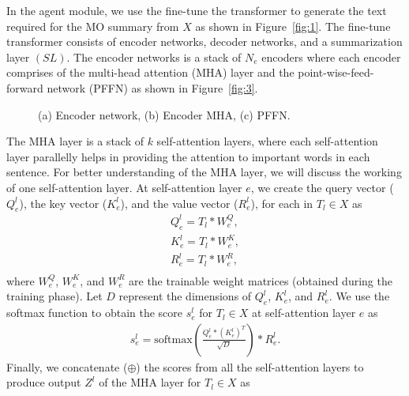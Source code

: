 \documentclass[preprint,review,12pt]{elsarticle}
\begin{document}
 In the agent module, we use the fine-tune the transformer to generate the text required for the MO summary from $X$ as shown in Figure~\ref{fig:1}. The fine-tune transformer consists of encoder networks, decoder networks, and a summarization layer $(SL)$. The encoder networks is a stack of $N_e$ encoders where each encoder comprises of the multi-head attention (MHA) layer and the point-wise-feed-forward network (PFFN) as shown in Figure~\ref{fig:3}.
	\begin{figure}	
	\begin{center}		
		\qquad
		\qquad
		\qquad
		\qquad
		\qquad
		\qquad
	\end{center}
	\vspace*{-\baselineskip}
	\caption{(a) Encoder network, (b) Encoder MHA, (c) PFFN. } 
\end{figure}
The MHA layer is a stack of $k$ self-attention layers, where each self-attention layer parallelly helps in providing the attention to important words in each sentence. For better understanding of the MHA layer, we will discuss the working of one self-attention layer. At self-attention layer $e$, we create the query vector ($Q_e^l$), the key vector ($K_e^l$), and the value vector ($R_e^l$), for each in $T_l \in X$ as
\begin{equation}
	\begin{aligned}
	Q_e^l = T_l * W_e^Q,\\
	K_e^l = T_l  * W_e^K,\\
	R_e^l = T_l * W_e^R,\\
		\end{aligned}
\end{equation}
where $W_e^Q$, $W_e^K$, and $W_e^R$ are the trainable weight matrices (obtained during the training phase). Let $D$ represent the dimensions of $Q_e^l$, $K_e^l $, and $R_e^l $. We use the softmax function to obtain the score $s_e^l$ for $T_l \in X$ at self-attention layer $e$ as  
\begin{equation}
	\begin{aligned}
		s_e^l = \text{softmax}\left(\frac{Q_e^l * (K_e^l)^T }{\sqrt{D}}\right)*R_e^l.
	\end{aligned}
\end{equation}
Finally, we concatenate ($\oplus$) the scores from all the self-attention layers to produce output $Z^l$ of the MHA layer for $T_l \in X$ as  
\end{document}
